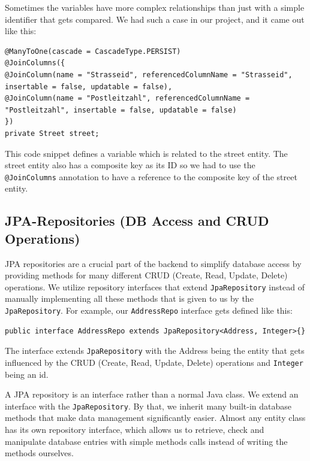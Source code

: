     Sometimes the variables have more complex relationships than just with a simple identifier that gets compared. We had such a case in our project, and it came out like this: 
    \begin{verbatim}
@ManyToOne(cascade = CascadeType.PERSIST)
@JoinColumns({
@JoinColumn(name = "Strasseid", referencedColumnName = "Strasseid", insertable = false, updatable = false),
@JoinColumn(name = "Postleitzahl", referencedColumnName = "Postleitzahl", insertable = false, updatable = false)
})
private Street street;                   
    \end{verbatim} 
    This code snippet defines a variable which is related to the street entity. The street entity also has a composite key as its ID so we had to use the \texttt{@JoinColumns} annotation to have a reference to the composite key of the street entity. 

    \subsection{JPA-Repositories (DB Access and CRUD Operations)}
    JPA repositories are a crucial part of the backend to simplify database access by providing methods for many different CRUD (Create, Read, Update, Delete) operations. We utilize repository interfaces that extend \texttt{JpaRepository} instead of manually implementing all these methods that is given to us by the \texttt{JpaRepository}. For example, our \texttt{AddressRepo} interface gets defined like this:  \newline
    \begin{verbatim}
public interface AddressRepo extends JpaRepository<Address, Integer>{}          
    \end{verbatim} 
    \pagebreak
    The interface extends \texttt{JpaRepository} with the Address being the entity that gets influenced by the CRUD (Create, Read, Update, Delete) operations and \texttt{Integer} being an id. \newline

    A JPA repository is an interface rather than a normal Java class. We extend an interface with the \texttt{JpaRepository}. By that, we inherit many built-in database methods that make data management significantly easier. Almost any entity class has its own repository interface, which allows us to retrieve, check and manipulate database entries with simple methods calls instead of writing the methods ourselves. \newline

